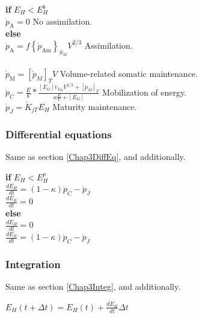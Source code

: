 \textbf{if}	$E_{H} < E_{H}^b$\\

$\dot{p}_\mathrm{A} = 0$ \hfill No assimilation.\\

\textbf{else}\\

$\dot{p}_\mathrm{A} = f \left \{ \dot{p}_\mathrm{Am} \right \}_{S_{M}} V^{2/3}$ \hfill Assimilation.\\

\hfill \\

$\dot{p}_\mathrm{M} = \left [ \dot{p}_{M} \right ]_{T} V$ \hfill Volume-related somatic maintenance.\\

$\dot{p}_{C} = \frac{E}{V}*\frac{\left [ E_{G} \right ]\dot{v}_{S_{M}}V^{2/3}+\left [ \dot{p}_{M} \right ]_{T}}{\kappa\frac{E}{V}+\left [ E_{G} \right ]}$ \hfill Mobilization of energy.\\

$\dot{p}_{J} = \dot{K}_{jT} E_{H}$ \hfill Maturity maintenance.\\

\subsubsection{Differential equations}\label{Chap4DiffEq}
Same as section \ref{Chap3DiffEq}, and additionally.

\textbf{if} $E_{H} < E_{H}^p$\\

$\frac{dE_{H}}{dt} = (1 - \kappa) \dot{p}_{C} - \dot{p}_{J}$\\

$\frac{dE_{R}}{dt} = 0$\\

\textbf{else}\\

$\frac{dE_{H}}{dt} = 0$\\

$\frac{dE_{R}}{dt} = (1 - \kappa) \dot{p}_{C} - \dot{p}_{J}$\\

\subsubsection{Integration}\label{Chap4Integ}
Same as section \ref{Chap3Integ}, and additionally.

$E_{H}\left ( t + \Delta t \right ) = E_{H}\left ( t \right ) + \frac{dE_{H}}{dt}\Delta t$ \\

